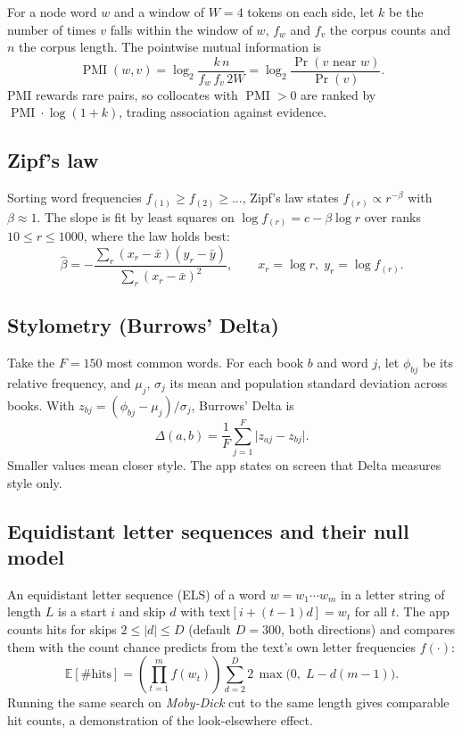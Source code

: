\documentclass[11pt]{article}
\begin{document}
For a node word $w$ and a window of $W = 4$ tokens on each side, let $k$ be the
number of times $v$ falls within the window of $w$, $f_w$ and $f_v$ the corpus
counts and $n$ the corpus length. The pointwise mutual information is
\begin{equation}
  \operatorname{PMI}(w, v) = \log_2 \frac{k\, n}{f_w\, f_v\, 2W}
  = \log_2 \frac{\Pr(v \text{ near } w)}{\Pr(v)}.
\end{equation}
PMI rewards rare pairs, so collocates with $\operatorname{PMI} > 0$ are ranked by
$\operatorname{PMI}\cdot\log(1 + k)$, trading association against evidence.

\subsection{Zipf's law}

Sorting word frequencies $f_{(1)} \ge f_{(2)} \ge \dots$, Zipf's law states
$f_{(r)} \propto r^{-\beta}$ with $\beta \approx 1$. The slope is fit by least
squares on $\log f_{(r)} = c - \beta \log r$ over ranks $10 \le r \le 1000$,
where the law holds best:
\begin{equation}
  \hat{\beta} = -\frac{\sum_r (x_r - \bar{x})(y_r - \bar{y})}{\sum_r (x_r - \bar{x})^2},
  \qquad x_r = \log r, \; y_r = \log f_{(r)}.
\end{equation}

\subsection{Stylometry (Burrows' Delta)}

Take the $F = 150$ most common words. For each book $b$ and word $j$, let
$\phi_{bj}$ be its relative frequency, and $\mu_j$, $\sigma_j$ its mean and
population standard deviation across books. With
$z_{bj} = (\phi_{bj} - \mu_j)/\sigma_j$, Burrows' Delta \cite{burrows} is
\begin{equation}
  \Delta(a, b) = \frac{1}{F}\sum_{j=1}^{F} \lvert z_{aj} - z_{bj} \rvert.
\end{equation}
Smaller values mean closer style. The app states on screen that Delta measures
style only.

\subsection{Equidistant letter sequences and their null model}

An equidistant letter sequence (ELS) of a word $w = w_1\cdots w_m$ in a letter
string of length $L$ is a start $i$ and skip $d$ with
$\text{text}[i + (t-1)d] = w_t$ for all $t$. The app counts hits for skips
$2 \le |d| \le D$ (default $D = 300$, both directions) and compares them with
the count chance predicts from the text's own letter frequencies $f(\cdot)$:
\begin{equation}
  \mathbb{E}[\#\text{hits}] = \left(\prod_{t=1}^{m} f(w_t)\right)
  \sum_{d=2}^{D} 2\,\max\!\bigl(0,\; L - d(m-1)\bigr).
\end{equation}
Running the same search on \emph{Moby-Dick} cut to the same length gives
comparable hit counts, a demonstration of the look-elsewhere effect.
\end{document}
